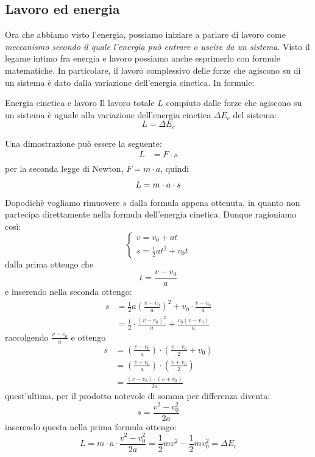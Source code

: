 \subsection{Lavoro ed energia}
Ora che abbiamo visto l'energia, possiamo iniziare a parlare di lavoro come \textit{meccanismo secondo il quale l'energia può entrare o uscire da un sistema}. Visto il legame intimo fra energia e lavoro possiamo anche esprimerlo con formule matematiche. In particolare, il lavoro complessivo delle forze che agiscono su di un sistema è dato dalla variazione dell'energia cinetica. In formule:
\begin{teorema}{Energia cinetica e lavoro}
	Il lavoro totale $ L $ compiuto dalle forze che agiscono su un sistema è uguale alla variazione dell'energia cinetica $ \Delta E_c $ del sistema:
	\[
		L = \Delta E_c
	\]
\end{teorema}
Una dimostrazione può essere la seguente:
\begin{align*}
	L & = F \cdot s \\
\end{align*}
per la seconda legge di Newton, $ F = m \cdot a $, quindi
\[
	L = m \cdot a \cdot s \\
\]
Dopodichè vogliamo rimuovere $ s $ dalla formula appena ottenuta, in quanto non partecipa direttamente nella formula dell'energia cinetica. Dunque ragioniamo così:
\[
	\begin{cases}
		v = v_0 + at \\
		s =  \frac{1}{2} at^2 + v_0t
	\end{cases}
\]
dalla prima ottengo che
\[
	t = \frac{v - v_0}{a}
\]
e inserendo nella seconda ottengo:
\begin{align*}
	s & = \frac{1}{2} a \left(\frac{v - v_0}{a}\right)^2 + v_0 \cdot \frac{v - v_0}{a}           \\
	  & = \frac{1}{2} \cdot \frac{\left(v - v_0\right)^2}{a} + \frac{v_0\left(v - v_0\right)}{a}
\end{align*}
raccolgendo $ \frac{v - v_0}{a} $ e ottengo
\begin{align*}
	s & = \left(\frac{v - v_0}{a}\right) \cdot  \left(\frac{v - v_0}{2} + v_0\right) \\
	  & = \left(\frac{v - v_0}{a}\right) \cdot  \left(\frac{v + v_0}{2}\right)       \\
	  & = \frac{\left(v - v_0\right) \cdot \left(v + v_0\right)}{2a}
\end{align*}
quest'ultima, per il prodotto notevole di somma per differenza diventa:
\[
	s = \frac{v^2  - v_0^2 }{2a}
\]
inserendo questa nella prima formula ottengo:
\[
	L = m \cdot a \cdot \frac{v^2  - v_0^2 }{2a} = \frac{1}{2} m v^2  - \frac{1}{2} m v_0^2  = \Delta E_c
\]

